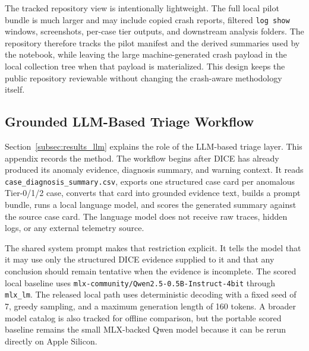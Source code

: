 The tracked repository view is intentionally lightweight. The full local pilot bundle is much larger and may include copied crash reports, filtered \texttt{log show} windows, screenshots, per-case tier outputs, and downstream analysis folders. The repository therefore tracks the pilot manifest and the derived summaries used by the notebook, while leaving the large machine-generated crash payload in the local collection tree when that payload is materialized. This design keeps the public repository reviewable without changing the crash-aware methodology itself.

\FloatBarrier

\subsection{Grounded LLM-Based Triage Workflow}\label{app:llm_method}

Section~\ref{subsec:results_llm} explains the role of the LLM-based triage layer. This appendix records the method. The workflow begins after \textsc{DICE} has already produced its anomaly evidence, diagnosis summary, and warning context. It reads \texttt{case\_diagnosis\_summary.csv}, exports one structured case card per anomalous Tier-0/1/2 case, converts that card into grounded evidence text, builds a prompt bundle, runs a local language model, and scores the generated summary against the source case card. The language model does not receive raw traces, hidden logs, or any external telemetry source.

The shared system prompt makes that restriction explicit. It tells the model that it may use only the structured \textsc{DICE} evidence supplied to it and that any conclusion should remain tentative when the evidence is incomplete. The scored local baseline uses \texttt{mlx-community/Qwen2.5-0.5B-Instruct-4bit} through \texttt{mlx\_lm}. The released local path uses deterministic decoding with a fixed seed of 7, greedy sampling, and a maximum generation length of 160 tokens. A broader model catalog is also tracked for offline comparison, but the portable scored baseline remains the small MLX-backed Qwen model because it can be rerun directly on Apple Silicon.

